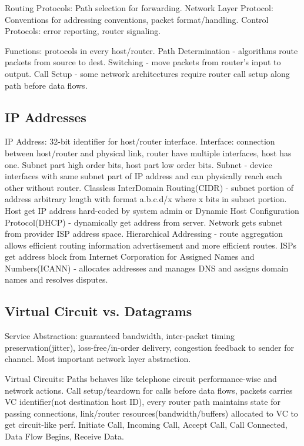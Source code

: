 \documentclass[9pt]{extarticle}
\begin{document}
\begin{multicols}{2}
Routing Protocols: Path selection for forwarding. Network Layer Protocol: Conventions for addressing conventions, packet format/handling. Control Protocols: error reporting, router signaling.

Functions: protocols in every host/router. Path Determination - algorithms route packets from source to dest.  Switching - move packets from router’s input to output. Call Setup - some network architectures require router call setup along path before data flows.

\subsection{IP Addresses}

IP Address: 32-bit identifier for host/router interface. Interface: connection between host/router and physical link, router have multiple interfaces, host has one. Subnet part high order bits, host part low order bits. Subnet - device interfaces with same subnet part of IP address and can physically reach each other without router. Classless InterDomain Routing(CIDR) - subnet portion of address arbitrary length with format a.b.c.d/x where x bits in subnet portion. Host get IP address hard-coded by system admin or Dynamic Host Configuration Protocol(DHCP) - dynamically get address from server. Network gets subnet from provider ISP address space. Hierarchical Addressing - route aggregation allows efficient routing information advertisement and more efficient routes. ISPs get address block from Internet Corporation for Assigned Names and Numbers(ICANN) - allocates addresses and manages DNS and assigns domain names and resolves disputes.

\subsection{Virtual Circuit vs. Datagrams}

Service Abstraction: guaranteed bandwidth, inter-packet timing preservation(jitter), loss-free/in-order delivery, congestion feedback to sender for channel. Most important network layer abstraction.

Virtual Circuits: Paths behaves like telephone circuit performance-wise and network actions. Call setup/teardown for calls before data flows, packets carries VC identifier(not destination host ID), every router path maintains state for passing connections, link/router resources(bandwidth/buffers) allocated to VC to get circuit-like perf. Initiate Call, Incoming Call, Accept Call, Call Connected, Data Flow Begins, Receive Data.


\end{multicols}
\end{document}
